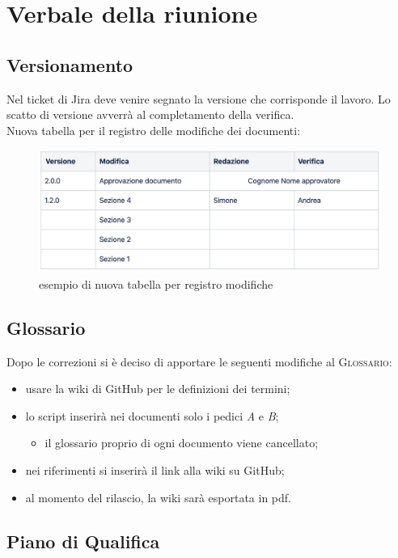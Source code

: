 \section{Verbale della riunione}
\subsection{Versionamento}
Nel ticket di Jira deve venire segnato la versione che corrisponde il lavoro. Lo scatto di versione avverrà al completamento della verifica.
\\Nuova tabella per il registro delle modifiche dei documenti:
\begin{figure}[H]
	\centering
	\includegraphics[scale=0.52]{res/images/tabella.png}
	\caption{esempio di nuova tabella per registro modifiche}
\end{figure}

\subsection{Glossario}
Dopo le correzioni si è deciso di apportare le seguenti modifiche al \textsc{Glossario}:
\begin{itemize}
	\item usare la wiki di GitHub per le definizioni dei termini;
	\item lo script inserirà nei documenti solo i pedici \textit{A} e \textit{B};
	\begin{itemize}
		\item il glossario proprio di ogni documento viene cancellato;
	\end{itemize}
	\item nei riferimenti si inserirà il link alla wiki su GitHub;
	\item al momento del rilascio, la wiki sarà esportata in pdf.
\end{itemize}

\subsection{Piano di Qualifica}
